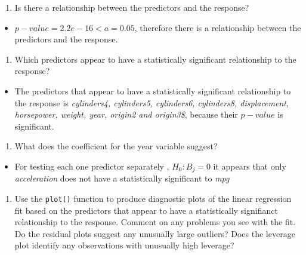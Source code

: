 \documentclass[
]{article}
\providecommand{\tightlist}{%
  \setlength{\itemsep}{0pt}\setlength{\parskip}{0pt}}
\begin{document}
\begin{enumerate}
\def\labelenumi{\roman{enumi}.}
\tightlist
\item
  Is there a relationship between the predictors and the response?
\end{enumerate}

\begin{itemize}
\tightlist
\item
  \(p-value = 2.2e-16 < a = 0.05\), therefore there is a relationship
  between the predictors and the response.
\end{itemize}

\begin{enumerate}
\def\labelenumi{\roman{enumi}.}
\setcounter{enumi}{1}
\tightlist
\item
  Which predictors appear to have a statistically significant
  relationship to the response?
\end{enumerate}

\begin{itemize}
\tightlist
\item
  The predictors that appear to have a statistically significant
  relationship to the response is \emph{cylinders4, cylinders5,
  cylinders6, cylinders8, displacement, horsepower, weight, year,
  origin2 and origin3\$}, because their \(p-value\) is significant.
\end{itemize}

\begin{enumerate}
\def\labelenumi{\roman{enumi}.}
\setcounter{enumi}{2}
\tightlist
\item
  What does the coefficient for the year variable suggest?
\end{enumerate}

\begin{itemize}
\tightlist
\item
  For testing each one predictor separately , \(H_0 : B_j = 0\) it
  appears that only \emph{acceleration} does not have a statistically
  significant to \emph{mpg}
\end{itemize}

\begin{enumerate}
\def\labelenumi{(\alph{enumi})}
\setcounter{enumi}{3}
\tightlist
\item
  Use the \texttt{plot()} function to produce diagnostic plots of the
  linear regression fit based on the predictors that appear to have a
  statistically signifianct relationship to the response. Comment on any
  problems you see with the fit. Do the residual plots suggest any
  unusually large outliers? Does the leverage plot identify any
  observations with unusually high leverage?
\end{enumerate}
\end{document}
